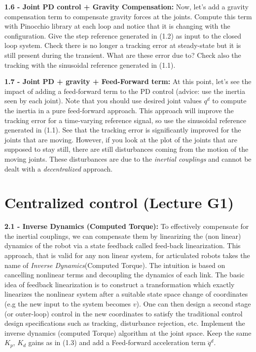\documentclass[11pt]{article}
\begin{document}
\quad

\noindent
\textbf{1.6 - Joint PD control + Gravity Compensation:}
Now, let's add a gravity compensation term to compensate gravity forces at the joints. 
Compute this term with Pinocchio library at each loop and notice that it is changing with the configuration. 
Give the step reference generated in (1.2) as input to the closed loop system. 
Check there is no longer a  tracking error at steady-state but it is still present during the transient. What are these error due to?
Check also the tracking with the sinusoidal reference generated in (1.1).

\quad

\noindent
\textbf{1.7 - Joint  PD + gravity + Feed-Forward term:}
At this point, let's see the impact of adding a feed-forward term to the PD control (advice: use the inertia seen by each joint). Note that you should use desired joint values $q^d$ to compute the inertia in a pure feed-forward approach. This approach will improve the tracking error for a time-varying reference signal, so use the sinusoidal reference generated in (1.1).  See that the tracking error is significantly improved for the joints that are moving. However, if you look at the plot of the joints that are supposed to stay still, there are still disturbances coming from the motion of the moving joints. These disturbances are  due to the \textit{inertial couplings} and cannot be dealt with a \textit{decentralized} approach.

\quad

\section{Centralized control (Lecture G1)}

\noindent
\textbf{2.1 - Inverse Dynamics (Computed Torque):}
To effectively compensate for the inertial couplings, we can compensate them by 
linearizing the (non linear) dynamics of the robot via a state feedback called feed-back linearization. 
This approach, that is valid for any non linear system, for articulated robots takes the name of \textit{Inverse Dynamics}(Computed Torque). 
The intuition is based on cancelling nonlinear terms and decoupling the dynamics of each link.
The basic idea of feedback linearization is to construct a transformation which exactly linearizes the
nonlinear system after a suitable state space change of coordinates (e.g the new input to the system becomes $v$).
 One can then design a second stage (or outer-loop) control in the new coordinates to satisfy the traditional control design specifications such as tracking,
disturbance rejection, etc.
Implement the inverse dynamics  (computed Torque) algorithm at the joint space. Keep the same $K_p$, $K_d$ gains as in (1.3) and add a Feed-forward acceleration term $\ddot{q}^d$. 
\end{document}
